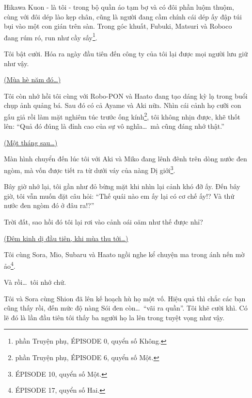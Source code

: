 \documentclass[../main.tex]{subfiles}
\begin{document}
Hikawa Kuon - là tôi - trong bộ quần áo tạm bợ và có đôi phần luộm thuộm, cùng với đôi dép lào kẹp chân, cũng là người đang cầm chính cái dép ấy đập túi bụi vào một con gián trên sàn. Trong góc khuất, Fubuki, Matsuri và Roboco đang rúm ró, run như cầy sấy\footnote{phần {\abv Truyện phụ}, {\flaregothic ÉPISODE 0}, quyển số Không.}.

Tôi bật cười. Hóa ra ngày đầu tiên đến công ty của tôi lại được mọi người lưu giữ như vậy.

\ct

\begin{center}
    \uline{(Mùa hè năm đó\dots)}
\end{center}

Tôi còn nhớ hồi tôi cùng với Robo-PON và Haato đang tạo dáng kỳ lạ trong buổi chụp ảnh quảng bá. Sau đó có cả Ayame và Aki nữa. Nhìn cái cảnh họ cưỡi con gấu giả rồi làm mặt nghiêm túc trước ống kính\footnote{phần {\abv Truyện phụ}, {\flaregothic ÉPISODE 6}, quyển số Một.}, tôi không nhịn được, khẽ thốt lên: ``Quả đó đúng là đỉnh cao của sự vô nghĩa\dots\ mà cũng đáng nhớ thật.''

\begin{center}
    \uline{(Một tháng sau\dots)}
\end{center}

Màn hình chuyển đến lúc tôi với Aki và Miko đang lênh đênh trên dòng nước đen ngòm, mà vốn được tiết ra từ dưới váy của nàng Dị giới\footnote{{\flaregothic ÉPISODE 10}, quyển số Một.}.

Bây giờ nhớ lại, tôi gần như đỏ bừng mặt khi nhìn lại cảnh khó đỡ ấy. Đến bây giờ, tôi vẫn muốn đặt câu hỏi: ``Thế quái nào em ấy lại có cơ chế ấy!? Và thứ nước đen ngòm đó ở đâu ra!?''

Trời đất, sao hồi đó tôi lại rơi vào cảnh oái oăm như thế được nhỉ?

\begin{center}
    \uline{(Đêm kinh dị đầu tiên, khi mùa thu tới\dots)}
\end{center}

Tôi cùng Sora, Mio, Subaru và Haato ngồi nghe kể chuyện ma trong ánh nến mờ ảo\footnote{{\flaregothic ÉPISODE 17}, quyển số Hai.}.

Và rồi\dots\ tôi nhớ chứ.

Tôi và Sora cùng Shion đã lên kế hoạch hù họ một vố. Hiệu quả thì chắc các bạn cũng thấy rồi, đến mức độ nàng Sói đen còn\dots\ ``vãi ra quần''. Tôi khẽ cười khì. Có lẽ đó là lần đầu tiên tôi thấy ba người họ la lên trong tuyệt vọng như vậy.
\end{document}
